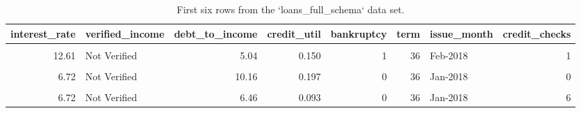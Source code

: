 \documentclass[
  10pt,
  openany]{book}
\theoremstyle{definition}
\theoremstyle{definition}
\theoremstyle{definition}
\theoremstyle{definition}
\theoremstyle{remark}
\begin{document}
\begin{table}
\centering
\caption{\label{tab:loansDataMatrix}First six rows from the `loans_full_schema` data set.}
\centering
\begin{tabular}[t]{r|l|r|r|r|r|l|r}
\hline
interest\_rate & verified\_income & debt\_to\_income & credit\_util & bankruptcy & term & issue\_month & credit\_checks\\
\hline
\cellcolor{gray!10}{14.07} & \cellcolor{gray!10}{Verified} & \cellcolor{gray!10}{18.01} & \cellcolor{gray!10}{0.548} & \cellcolor{gray!10}{0} & \cellcolor{gray!10}{60} & \cellcolor{gray!10}{Mar-2018} & \cellcolor{gray!10}{6}\\
\hline
12.61 & Not Verified & 5.04 & 0.150 & 1 & 36 & Feb-2018 & 1\\
\hline
\cellcolor{gray!10}{17.09} & \cellcolor{gray!10}{Source Verified} & \cellcolor{gray!10}{21.15} & \cellcolor{gray!10}{0.661} & \cellcolor{gray!10}{0} & \cellcolor{gray!10}{36} & \cellcolor{gray!10}{Feb-2018} & \cellcolor{gray!10}{4}\\
\hline
6.72 & Not Verified & 10.16 & 0.197 & 0 & 36 & Jan-2018 & 0\\
\hline
\cellcolor{gray!10}{14.07} & \cellcolor{gray!10}{Verified} & \cellcolor{gray!10}{57.96} & \cellcolor{gray!10}{0.755} & \cellcolor{gray!10}{0} & \cellcolor{gray!10}{36} & \cellcolor{gray!10}{Mar-2018} & \cellcolor{gray!10}{7}\\
\hline
6.72 & Not Verified & 6.46 & 0.093 & 0 & 36 & Jan-2018 & 6\\
\hline
\end{tabular}
\end{table}
\end{document}
